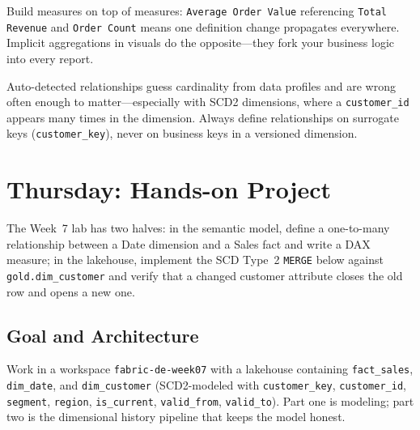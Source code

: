 \begin{tipbox}
Build measures on top of measures: \texttt{Average Order Value} referencing \texttt{Total Revenue} and \texttt{Order Count} means one definition change propagates everywhere. Implicit aggregations in visuals do the opposite---they fork your business logic into every report.
\end{tipbox}

\begin{pitfall}
Auto-detected relationships guess cardinality from data profiles and are wrong often enough to matter---especially with SCD2 dimensions, where a \texttt{customer\_id} appears many times in the dimension. Always define relationships on surrogate keys (\texttt{customer\_key}), never on business keys in a versioned dimension.
\end{pitfall}

\section{Thursday: Hands-on Project}
The Week~7 lab has two halves: in the semantic model, define a one-to-many relationship between a Date dimension and a Sales fact and write a DAX measure; in the lakehouse, implement the SCD Type~2 \texttt{MERGE} below against \texttt{gold.dim\_customer} and verify that a changed customer attribute closes the old row and opens a new one.

\subsection{Goal and Architecture}
Work in a workspace \texttt{fabric-de-week07} with a lakehouse containing \texttt{fact\_sales}, \texttt{dim\_date}, and \texttt{dim\_customer} (SCD2-modeled with \texttt{customer\_key}, \texttt{customer\_id}, \texttt{segment}, \texttt{region}, \texttt{is\_current}, \texttt{valid\_from}, \texttt{valid\_to}). Part one is modeling; part two is the dimensional history pipeline that keeps the model honest.

